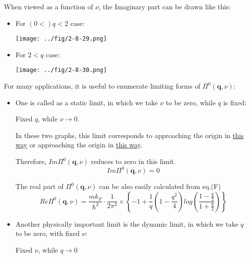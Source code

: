 When viewed as a function of $\nu$, the Imaginary part can be drawn like this:

\begin{itemize}
\item For $(0 < ) q < 2$ case:
\begin{center}\label{Fig2.8.29}
\texttt{[image: ../fig/2-8-29.png]}
\end{center}
\item For $2 < q$ case:
\begin{center}\label{Fig2.8.30}
\texttt{[image: ../fig/2-8-30.png]}
\end{center}
\end{itemize}

For many applications, it is useful to enumerate limiting forms of $\Pi^0(\mathbf{q},\nu)$:
\begin{itemize}
\item One is called as a static limit, in which we take $\nu$ to be zero, while $q$ is fixed:

\begin{center}Fixed $q$, while $\nu \rightarrow 0$.\end{center}

In these two graphs, this limit corresponds to approaching the origin in \underline{this way} or approaching the origin in \underline{this way}.

Therefore, $Im\Pi^0(\mathbf{q},\nu)$ reduces to zero in this limit.
\begin{equation} \label{Eqs2.8.25.a} \tag{2.8.25.a}
Im\Pi^0(\mathbf{q},\nu) = 0
\end{equation}
\setcounter{equation}{25}

The real part of $\Pi^0(\mathbf{q},\nu)$ can be also easily calculated from eq.(F)
\begin{equation*} \label{Eqs2.8.25.b} \tag{2.8.25.b}
Re\Pi^0(\mathbf{q},\nu) = \frac{m k_F}{\hbar^2}\cdot \frac{1}{2\pi^2} \times \left\{ -1 + \frac{1}{q}(1-\frac{q^2}{4})log\left( \frac{1-\frac{q}{2}}{1+\frac{q}{2}} \right) \right\}
\end{equation*}

\item Another physically important limit is the dynamic limit, in which we take $q$ to be zero, with fixed $\nu$:

\begin{center}Fixed $\nu$, while $q\rightarrow 0$\end{center}


\end{itemize}
